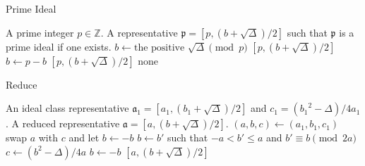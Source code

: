 \documentclass{ucalgthes1}
\theoremstyle{plain}
\theoremstyle{definition}
\newcommand{\ZZ}{\mathbb{Z}}
\begin{document}
\bigbreak
\bigbreak


\begin{comment}
\begin{algorithm}[h]
\caption{Identity}
\label{alg:identity}
\begin{algorithmic}[1]
\ENSURE A reduced representative for the class of principal ideals.
\IF {$\Delta \equiv 1 \pmod 4$}
	\STATE Let $b = 1$.
\ELSE
	\STATE Let $b = 0$.
\ENDIF
\RETURN $[1, (b+\sqrt\Delta)/2]$.
\end{algorithmic}
\end{algorithm}
\end{comment}

\begin{comment}
\begin{algorithm}[h]
\caption{Iverse}
\label{alg:inverse}
\begin{algorithmic}[1]
\REQUIRE A reduced representative $\mathfrak a = [a, (b+\sqrt\Delta)/2]$.
\ENSURE A reduced representative $\mathfrak a^{-1}$ such that $\mathfrak a \mathfrak a^{-1}$ is principal.
\RETURN $[a, (-b+\sqrt\Delta)/2]$.
\end{algorithmic}
\end{algorithm}
\end{comment}


\begin{algorithm}[h]
\caption{Prime Ideal}
\label{alg:prime}
\begin{algorithmic}[1]
\REQUIRE A prime integer $p \in \ZZ$.
\ENSURE A representative $\mathfrak p = [p, (b+\sqrt\Delta)/2]$ such that $\mathfrak p$ is a prime ideal if one exists.
\STATE $b \gets \textrm{the positive } \sqrt\Delta \pmod p$
	\RETURN $[p, (b+\sqrt\Delta)/2]$
\ENDIF
\STATE $b \gets p-b$
	\RETURN $[p, (b+\sqrt\Delta)/2]$
\ENDIF
\RETURN none
\end{algorithmic}
\end{algorithm}


\begin{algorithm}[h]
\caption{Reduce}
\label{alg:reduce}
\begin{algorithmic}[1]
\REQUIRE An ideal class representative $\mathfrak a_1 = [a_1, (b_1+\sqrt\Delta)/2]$ and $c_1 = ({b_1}^2 - \Delta)/4a_1$.
\ENSURE A reduced representative $\mathfrak a = [a, (b+\sqrt\Delta)/2]$.
\STATE $(a, b, c) \gets (a_1, b_1, c_1)$
		\STATE swap $a$ with $c$ and let $b \gets -b$
	\ENDIF
		\STATE $b \gets b'$ such that $-a < b' \le a$ and $b' \equiv b \pmod{2a}$
		\STATE $c \gets (b^2-\Delta)/4a$
	\ENDIF
\ENDWHILE
{}
	\STATE $b \gets -b$
\ENDIF
\RETURN $[a, (b+\sqrt\Delta)/2]$
\end{algorithmic}
\end{algorithm}
\end{document}
